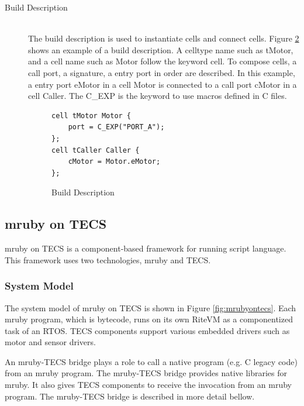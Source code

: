 \documentclass{sig-alternate-05-2015}
\begin{document}
\begin{description}
\begin{figure}[t]
\vspace{1mm}
\label{celltype}
\end{figure}
    \item[{\mybf Build Description}]\mbox{}\\
        The build description is used to instantiate {\myit cell}s and connect {\myit cell}s.
        Figure \ref{build} shows an example of a build description.
        A {\myit celltype} name such as tMotor, and a {\myit cell} name such as Motor follow the keyword {\myit cell}.
        To compose {\myit cell}s, a {\myit call} port, a {\myit signature}, a {\myit entry} port in order are described.
        In this example, a {\myit entry} port eMotor in a {\myit cell} Motor is connected to a {\myit call} port cMotor in a {\myit cell} Caller.
        The {\myit C\_EXP} is the keyword to use macros defined in C files.

\begin{figure}[t]
\centering
\begin{lstlisting}
cell tMotor Motor {
    port = C_EXP("PORT_A");
};
cell tCaller Caller {
    cMotor = Motor.eMotor;
};
\end{lstlisting}
\vspace{1mm}
\caption{Build Description}
\vspace{1mm}
\label{build}
\end{figure}

\end{description}

\subsection{mruby on TECS}
\label{sec:mruby on TECS}
mruby on TECS is a component-based framework for running script language.
This framework uses two technologies, mruby and TECS.

\subsubsection{System Model}
The system model of mruby on TECS is shown in Figure \ref{fig:mrubyontecs}.
Each mruby program, which is bytecode, runs on its own RiteVM as a componentized task of an RTOS.
TECS components support various embedded drivers such as motor and sensor drivers.

An mruby-TECS bridge plays a role to call a native program (e.g. C legacy code) from an mruby program.
The mruby-TECS bridge provides native libraries for mruby.
It also gives TECS components to receive the invocation from an mruby program.
The mruby-TECS bridge is described in more detail bellow.
\end{document}
